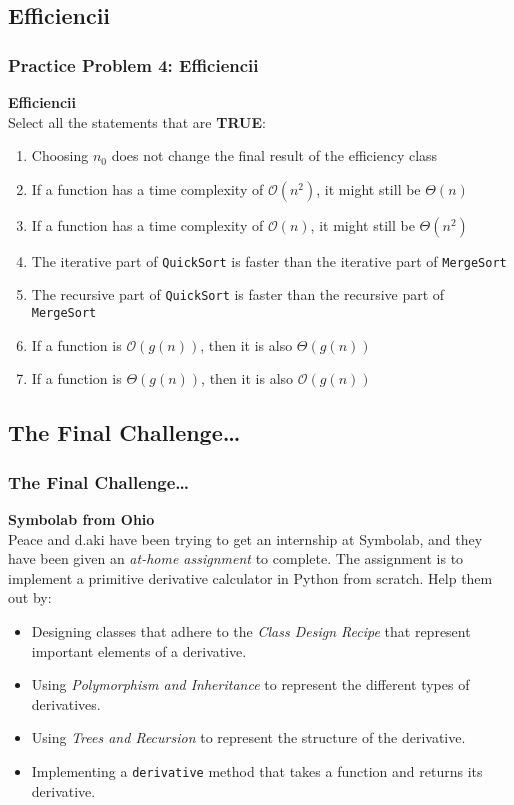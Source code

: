 \documentclass[hyperref={colorlinks,citecolor=blue,linkcolor=blue,urlcolor=blue}, aspectratio=1610]{beamer}
\begin{document}
\subsection{Efficiencii}
\begin{frame}
  \frametitle{Practice Problem 4: Efficiencii}
  \textbf{Efficiencii}\\
  Select all the statements that are \textbf{TRUE}:
  \begin{enumerate}
    \item Choosing $n_0$ does not change the final result of the efficiency class
    \item If a function has a time complexity of $\mathcal{O}(n^2)$, it might still be $\Theta(n)$
    \item If a function has a time complexity of $\mathcal{O}(n)$, it might still be $\Theta(n^2)$
    \item The iterative part of \texttt{QuickSort} is faster than the iterative part of \texttt{MergeSort}
    \item The recursive part of \texttt{QuickSort} is faster than the recursive part of \texttt{MergeSort}
    \item If a function is $\mathcal{O}(g(n))$, then it is also $\Theta(g(n))$
    \item If a function is $\Theta(g(n))$, then it is also $\mathcal{O}(g(n))$
  \end{enumerate}
\end{frame}

\subsection{The Final Challenge\ldots}
\begin{frame}
  \frametitle{The Final Challenge\ldots}
  \textbf{Symbolab from Ohio}\\
  Peace and d.aki have been trying to get an internship at Symbolab, and they have been given an \textit{at-home assignment} to complete. The assignment is to implement a primitive derivative calculator in Python from scratch. Help them out by:
  \begin{itemize}
    \item Designing classes that adhere to the \textit{Class Design Recipe} that represent important elements of a derivative.
    \item Using \textit{Polymorphism and Inheritance} to represent the different types of derivatives.
    \item Using \textit{Trees and Recursion} to represent the structure of the derivative.
    \item Implementing a \texttt{derivative} method that takes a function and returns its derivative.
  \end{itemize}
\end{frame}
\end{document}
